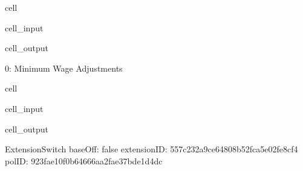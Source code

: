 \documentclass[letterpaper,10pt,english]{sphinxmanual}
\begin{document}
\begin{sphinxuseclass}{cell}
\begin{sphinxuseclass}{cell_input}
\begin{sphinxVerbatim}[commandchars=\\\{\}]
\PYG{p}{[}\PYG{p}{]}\PYG{p}{[}\PYG{p}{]}
\end{sphinxVerbatim}

\end{sphinxuseclass}
\begin{sphinxuseclass}{cell_output}
\begin{sphinxVerbatim}[commandchars=\\\{\}]
0: Minimum Wage Adjustments
\end{sphinxVerbatim}

\end{sphinxuseclass}
\end{sphinxuseclass}
\begin{sphinxuseclass}{cell}
\begin{sphinxuseclass}{cell_input}
\begin{sphinxVerbatim}[commandchars=\\\{\}]
\PYG{p}{[}\PYG{p}{]}\PYG{p}{[}\PYG{p}{]}\PYG{p}{[}\PYG{p}{]}
\end{sphinxVerbatim}

\end{sphinxuseclass}
\begin{sphinxuseclass}{cell_output}
\begin{sphinxVerbatim}[commandchars=\\\{\}]
\PYGZhy{}\PYGZhy{}\PYGZhy{}\PYGZhy{}\PYGZhy{}\PYGZhy{}\PYGZhy{}\PYGZhy{}\PYGZhy{}\PYGZhy{}\PYGZhy{}\PYGZhy{}\PYGZhy{}\PYGZhy{}\PYGZhy{}\PYGZhy{}\PYGZhy{}\PYGZhy{}\PYGZhy{}\PYGZhy{}\PYGZhy{}\PYGZhy{}\PYGZhy{}\PYGZhy{}\PYGZhy{}\PYGZhy{}\PYGZhy{}\PYGZhy{}\PYGZhy{}\PYGZhy{}
ExtensionSwitch
\PYGZhy{}\PYGZhy{}\PYGZhy{}\PYGZhy{}\PYGZhy{}\PYGZhy{}\PYGZhy{}\PYGZhy{}\PYGZhy{}\PYGZhy{}\PYGZhy{}\PYGZhy{}\PYGZhy{}\PYGZhy{}\PYGZhy{}\PYGZhy{}\PYGZhy{}\PYGZhy{}\PYGZhy{}\PYGZhy{}\PYGZhy{}\PYGZhy{}\PYGZhy{}\PYGZhy{}\PYGZhy{}\PYGZhy{}\PYGZhy{}\PYGZhy{}\PYGZhy{}\PYGZhy{}
	 baseOff: \PYGZsq{}false\PYGZsq{}
	 extensionID: \PYGZsq{}557c232a\PYGZhy{}9ce6\PYGZhy{}4808\PYGZhy{}b52f\PYGZhy{}ca5e02fe8cf4\PYGZsq{}
	 polID: \PYGZsq{}923fae10\PYGZhy{}f0b6\PYGZhy{}4666\PYGZhy{}aa2f\PYGZhy{}ae37bde1d4dc\PYGZsq{}
\end{sphinxVerbatim}

\end{sphinxuseclass}
\end{sphinxuseclass}
\end{document}
